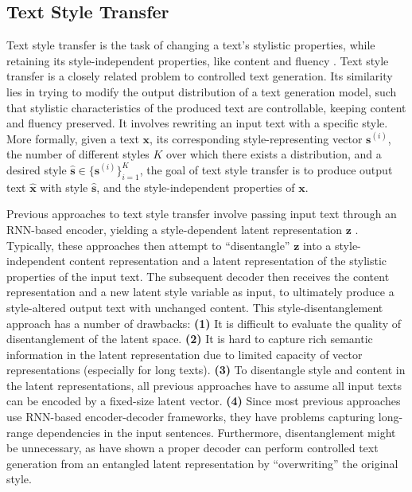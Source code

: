\subsection{Text Style Transfer}
Text style transfer is the task of changing a text's stylistic properties, while retaining its style-independent properties, like content and fluency \citep{dai2019style}. Text style transfer is a closely related problem to controlled text generation. Its similarity lies in trying to modify the output distribution of a text generation model, such that stylistic characteristics of the produced text are controllable, keeping content and fluency preserved. It involves rewriting an input text with a specific style. More formally, given a text $\textbf{x}$, its corresponding style-representing vector $\textbf{s}^{(i)}$, the number of different styles $K$ over which there exists a distribution, and a desired style $\hat{\textbf{s}} \in \{\textbf{s}^{(i)}\}_{i = 1}^{K}$, the goal of text style transfer is to produce output text $\hat{\textbf{x}}$ with style $\hat{\textbf{s}}$, and the style-independent properties of $\textbf{x}$. 

Previous approaches to text style transfer involve passing input text through an RNN-based encoder, yielding a style-dependent latent representation $\textbf{z}$ \citep{zhang2018styletranslation}. Typically, these approaches then attempt to ``disentangle'' $\textbf{z}$ into a style-independent content representation and a latent representation of the stylistic properties of the input text. The subsequent decoder then receives the content representation and a new latent style variable as input, to ultimately produce a style-altered output text with unchanged content. This style-disentanglement approach has a number of drawbacks: \textbf{(1)} It is difficult to evaluate the quality of disentanglement of the latent space. \textbf{(2)} It is hard to capture rich semantic information in the latent representation due to limited capacity of vector representations (especially for long texts). \textbf{(3)} To disentangle style and content in the latent representations, all previous approaches have to assume all input texts can be encoded by a fixed-size latent vector. \textbf{(4)} Since most previous approaches use RNN-based encoder-decoder frameworks, they have problems capturing long-range dependencies in the input sentences. Furthermore, disentanglement might be unnecessary, as \cite{lample2018multipleattribute} have shown a proper decoder can perform controlled text generation from an entangled latent representation by ``overwriting'' the original style.

